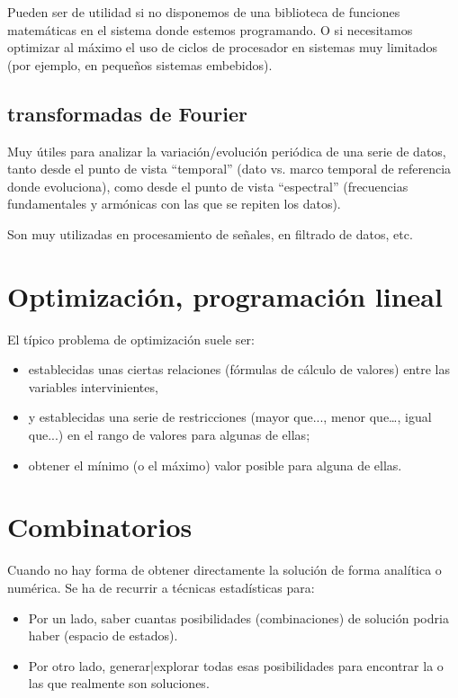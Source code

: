 \documentclass[spanish,12pt,a4paper,final,oneside]{book}
\begin{document}
Pueden ser de utilidad si no disponemos de una biblioteca de funciones matemáticas en el sistema donde estemos programando. O si necesitamos optimizar al máximo el uso de ciclos de procesador en sistemas muy limitados (por ejemplo, en pequeños sistemas embebidos).

\subsection{transformadas de Fourier}
Muy útiles para analizar la variación/evolución periódica de una serie de datos, tanto desde el punto de vista ``temporal'' (dato vs. marco temporal de referencia donde evoluciona), como desde el punto de vista ``espectral'' (frecuencias fundamentales y armónicas con las que se repiten los datos).

Son muy utilizadas en procesamiento de señales, en filtrado de datos, etc.

\section{Optimización, programación lineal}
El típico problema de optimización suele ser: 
\begin{itemize}
\item establecidas unas ciertas relaciones (fórmulas de cálculo de valores) entre las variables intervinientes, 
\item y establecidas una serie de restricciones (mayor que..., menor que…, igual que...) en el rango de valores para algunas de ellas; 
\item obtener el mínimo (o el máximo) valor posible para alguna de ellas.
\end{itemize}

\section{Combinatorios}
Cuando no hay forma de obtener directamente la solución de forma analítica o numérica. Se ha de recurrir a técnicas estadísticas para:
\begin{itemize}
\item Por un lado, saber cuantas posibilidades (combinaciones) de solución podria haber (espacio de estados).
\item Por otro lado, generar|explorar todas esas posibilidades para encontrar la o las que realmente son soluciones.
\end{itemize}
\end{document}
